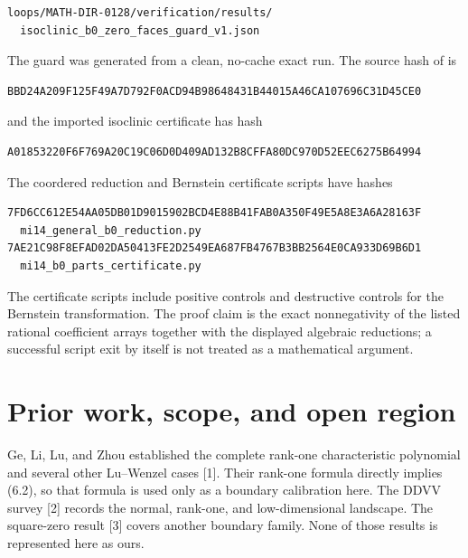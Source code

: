 \documentclass[11pt]{article}
\begin{document}
\begin{samepage}
\begin{Verbatim}[fontsize=\small]
loops/MATH-DIR-0128/verification/results/
  isoclinic_b0_zero_faces_guard_v1.json
\end{Verbatim}
\end{samepage}

The guard was generated from a clean, no-cache exact run. The source hash of \texttt{} is

\begin{samepage}
\begin{Verbatim}[fontsize=\small]
BBD24A209F125F49A7D792F0ACD94B98648431B44015A46CA107696C31D45CE0
\end{Verbatim}
\end{samepage}

and the imported isoclinic certificate has hash

\begin{samepage}
\begin{Verbatim}[fontsize=\small]
A01853220F6F769A20C19C06D0D409AD132B8CFFA80DC970D52EEC6275B64994
\end{Verbatim}
\end{samepage}

The coordered reduction and Bernstein certificate scripts have hashes

\begin{samepage}
\begin{Verbatim}[fontsize=\small]
7FD6CC612E54AA05DB01D9015902BCD4E88B41FAB0A350F49E5A8E3A6A28163F
  mi14_general_b0_reduction.py
7AE21C98F8EFAD02DA50413FE2D2549EA687FB4767B3BB2564E0CA933D69B6D1
  mi14_b0_parts_certificate.py
\end{Verbatim}
\end{samepage}

The certificate scripts include positive controls and destructive controls for the Bernstein transformation. The proof claim is the exact nonnegativity of the listed rational coefficient arrays together with the displayed algebraic reductions; a successful script exit by itself is not treated as a mathematical argument.

\section{Prior work, scope, and open region}

Ge, Li, Lu, and Zhou established the complete rank-one characteristic polynomial and several other Lu--Wenzel cases [1]. Their rank-one formula directly implies (6.2), so that formula is used only as a boundary calibration here. The DDVV survey [2] records the normal, rank-one, and low-dimensional landscape. The square-zero result [3] covers another boundary family. None of those results is represented here as ours.
\end{document}
